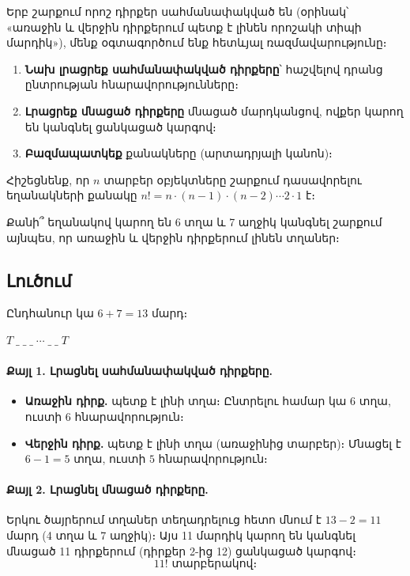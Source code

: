 \documentclass[12pt, a4paper]{article}
\begin{document}
\begin{theorybox}
Երբ շարքում որոշ դիրքեր սահմանափակված են (օրինակ՝ «առաջին և վերջին
դիրքերում պետք է լինեն որոշակի տիպի մարդիկ»), մենք օգտագործում ենք հետևյալ ռազմավարությունը։

\begin{enumerate}[nosep]
  \item \textbf{Նախ լրացրեք սահմանափակված դիրքերը}՝
        հաշվելով դրանց ընտրության հնարավորությունները։
  \item \textbf{Լրացրեք մնացած դիրքերը} մնացած մարդկանցով,
        ովքեր կարող են կանգնել ցանկացած կարգով։
  \item \textbf{Բազմապատկեք} քանակները (արտադրյալի կանոն)։
\end{enumerate}

\medskip
Հիշեցնենք, որ $n$ տարբեր օբյեկտները շարքում դասավորելու եղանակների քանակը
$n! = n \cdot (n-1) \cdot (n-2) \cdots 2 \cdot 1$ է։
\end{theorybox}

\begin{problembox}
Քանի՞ եղանակով կարող են 6 տղա և 7 աղջիկ կանգնել շարքում այնպես,
որ առաջին և վերջին դիրքերում լինեն տղաներ։
\end{problembox}

\subsection*{Լուծում}

Ընդհանուր կա $6 + 7 = 13$ մարդ։

\begin{center}
$\boxed{T}\;\_\;\_\;\_\;\cdots\;\_\;\_\;\boxed{T}$
\end{center}

\paragraph{Քայլ 1. Լրացնել սահմանափակված դիրքերը.}
\begin{itemize}[nosep]
  \item \textbf{Առաջին դիրք.} պետք է լինի տղա։
        Ընտրելու համար կա 6 տղա, ուստի $6$ հնարավորություն։
  \item \textbf{Վերջին դիրք.} պետք է լինի տղա (առաջինից տարբեր)։
        Մնացել է $6 - 1 = 5$ տղա, ուստի $5$ հնարավորություն։
\end{itemize}

\paragraph{Քայլ 2. Լրացնել մնացած դիրքերը.}
Երկու ծայրերում տղաներ տեղադրելուց հետո մնում է $13 - 2 = 11$ մարդ
(4 տղա և 7 աղջիկ)։ Այս 11 մարդիկ կարող են կանգնել մնացած
11 դիրքերում (դիրքեր 2-ից 12) ցանկացած կարգով։
\[
  11! \text{ տարբերակով։}
\]
\end{document}
